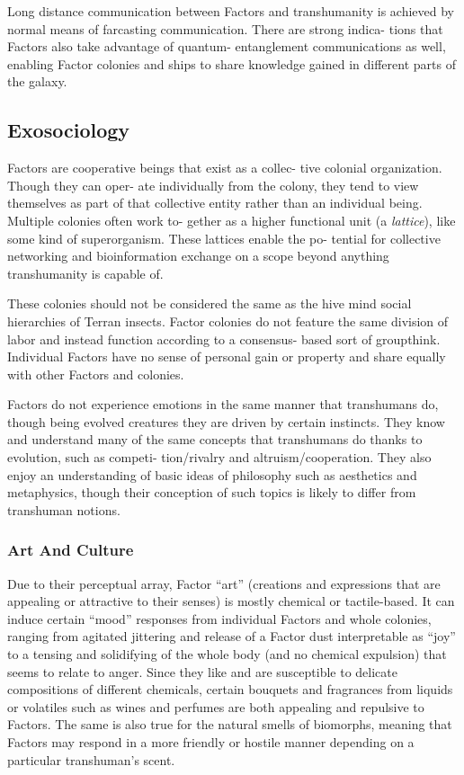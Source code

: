 Long distance communication between Factors 
and transhumanity is achieved by normal means of 
farcasting communication. There are strong indica-
tions that Factors also take advantage of quantum-
entanglement communications as well, enabling 
Factor colonies and ships to share knowledge gained 
in different parts of the galaxy. 

\subsection{Exosociology}

Factors are cooperative beings that exist as a collec-
tive colonial organization. Though they can oper-
ate individually from the colony, they tend to view 
themselves as part of that collective entity rather than 
an individual being. Multiple colonies often work to-
gether as a higher functional unit (a \textit{lattice}), like some 
kind of superorganism. These lattices enable the po-
tential for collective networking and bioinformation 
exchange on a scope beyond anything transhumanity 
is capable of. 

These colonies should not be considered the same 
as the hive mind social hierarchies of Terran insects. 
Factor colonies do not feature the same division of 
labor and instead function according to a consensus-
based sort of groupthink. Individual Factors have no 
sense of personal gain or property and share equally 
with other Factors and colonies. 

Factors do not experience emotions in the same 
manner that transhumans do, though being evolved 
creatures they are driven by certain instincts. They 
know and understand many of the same concepts that 
transhumans do thanks to evolution, such as competi-
tion/rivalry and altruism/cooperation. They also enjoy 
an understanding of basic ideas of philosophy such as 
aesthetics and metaphysics, though their conception of 
such topics is likely to differ from transhuman notions.

\subsubsection{Art And Culture }

Due to their perceptual array, Factor ``art'' (creations 
and expressions that are appealing or attractive to 
their senses) is mostly chemical or tactile-based. It 
can induce certain ``mood'' responses from individual 
Factors and whole colonies, ranging from agitated 
jittering and release of a Factor dust interpretable as 
``joy'' to a tensing and solidifying of the whole body 
(and no chemical expulsion) that seems to relate to 
anger. Since they like and are susceptible to delicate 
compositions of different chemicals, certain bouquets 
and fragrances from liquids or volatiles such as wines 
and perfumes are both appealing and repulsive to 
Factors. The same is also true for the natural smells 
of biomorphs, meaning that Factors may respond in 
a more friendly or hostile manner depending on a 
particular transhuman's scent.

